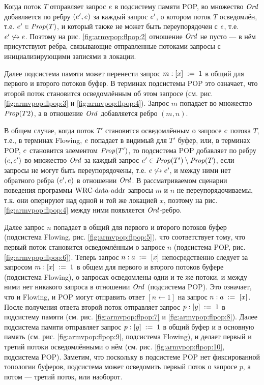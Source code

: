 Когда поток $T$ отправляет запрос $e$ в подсистему памяти POP,
во множество $\mathit{Ord}$ добавляется по ребру $(e', e)$
за каждый запрос $e'$, о котором поток $T$ осведомлён, т.е.
$e' \in \mathit{Prop}(T)$, и который также не может быть переупорядочен с $e$,
т.е. $e' \not \hookrightarrow e$.
Поэтому на рис. \ref{fig:armvpop:flpop:2} отношение $\mathit{Ord}$ не пусто ---
в нём присутствуют ребра, связывающие отправленные потоками запросы
с инициализирующими записями в локации.

Далее подсистема памяти может перенести запрос $m: [x]\;:=\;1$ в общий
для первого и второго потоков буфер. В терминах подсистемы POP это означает,
что второй поток становится осведомлённым об этом запросе
(см. рис. \ref{fig:armvpop:flpop:3} и \ref{fig:armvpop:flpop:4}).
Запрос $m$ попадает во множество $\mathit{Prop}(T2)$, а в отношение $\mathit{Ord}$ добавляется
ребро $(m, n)$.

В общем случае, когда поток $T'$ становится осведомлённым о запросе $e$ потока $T$,
т.е., в терминах Flowing, $e$ попадает в видимый для $T'$ буфер,
или, в терминах POP, $e$ становится элементом $\mathit{Prop}(T')$, то
подсистема POP добавляет по ребру $(e, e')$ во множество $\mathit{Ord}$
за каждый запрос $e' \in \mathit{Prop}(T') \setminus \mathit{Prop}(T)$, если
запросы не могут быть переупорядочены, т.е. $e \not \hookrightarrow e'$,
и между ними нет обратного ребра $(e', e)$ в отношении $\mathit{Ord}$.
В рассматриваемом сценарии поведения программы ${\rm WRC\text{-}data\text{-}addr}$
запросы $m$ и $n$ не переупорядочиваемы, т.к. они оперируют над одной и той же локацией $x$,
поэтому на рис. \ref{fig:armvpop:flpop:4} между ними появляется $\mathit{Ord}$-ребро.

Далее запрос $n$ попадает в общий для первого и второго потоков буфер
(подсистема Flowing, рис. \ref{fig:armvpop:flpop:5}), что
соответствует тому, что первый поток становится осведомлённым о запросе $n$
(подсистема POP, рис. \ref{fig:armvpop:flpop:6}).
Теперь запрос $n : a \;:=_{}\;[x]$ непосредственно следует за запросом $m : [x]\;:=\;1$
в общем для первого и второго потоков буфере (подсистема Flowing),
о запросах осведомлены одни и те же потоки, и между ними нет никакого запроса в отношении $\mathit{Ord}$
(подсистема POP).
Это означает, что и Flowing, и POP могут отправить ответ $[n \leftarrow 1]$ на запрос $n: a \;:=_{}\;[x]$.
После получения ответа второй поток отправляет запрос $p: [y]\;:=\;1$ в подсистему памяти
(см. рис. \ref{fig:armvpop:flpop:7} и \ref{fig:armvpop:flpop:8}).
Далее подсистема памяти отправляет запрос $p: [y]\;:=\;1$ в общий буфер и в основную память
(см. рис. \ref{fig:armvpop:flpop:9}, подсистема Flowing), и делает первый и третий потоки
осведомлёнными о нём
(см. рис. \ref{fig:armvpop:flpop:10}, подсистема POP).
Заметим, что поскольку в подсистеме POP нет фиксированной топологии буферов, подсистема может
осведомить первый поток о запросе $p$, а потом --- третий поток, или наоборот.

